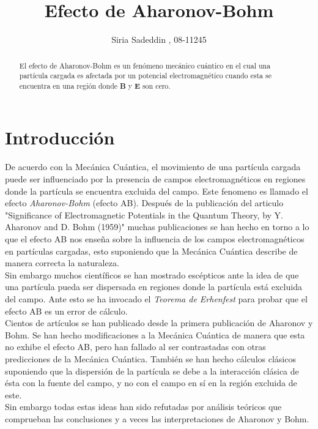 \documentclass[12pt]{article}
\title{Efecto de Aharonov-Bohm}
\author{Siria Sadeddin , 08-11245}
\begin{document}
\maketitle

\begin{abstract}
El efecto de Aharonov-Bohm es un fenómeno mecánico cuántico en el cual una partícula  cargada es afectada por un potencial electromagnético cuando esta se encuentra en una región donde \textbf{B} y \textbf{E} son cero. 
\end{abstract}
\section{Introducción}
De acuerdo con la Mecánica Cuántica, el movimiento de una partícula cargada puede ser influenciado por la presencia de campos electromagnéticos en regiones donde la partícula se encuentra excluida del campo. Este fenomeno es llamado el efecto \textit{Aharonov-Bohm} (efecto AB). Después de la publicación del articulo "Significance of Electromagnetic
Potentials in the Quantum Theory, by Y. Aharonov and D. Bohm (1959)"  muchas publicaciones se han hecho en torno a lo que el efecto AB nos enseña sobre la influencia de los campos electromagnéticos en partículas cargadas, esto suponiendo que la Mecánica Cuántica describe de manera correcta la naturaleza. \\
Sin embargo muchos científicos se han mostrado escépticos ante la idea de que una partícula pueda ser dispersada en regiones donde la partícula está excluida del campo. Ante esto se ha invocado el \textit{Teorema de Erhenfest} para probar que el efecto AB es un error de cálculo. \\
Cientos de artículos se han publicado desde la primera publicación de Aharonov y Bohm. Se han hecho modificaciones a la Mecánica Cuántica de manera que esta no exhibe el efecto AB, pero han fallado al ser contrastadas con otras predicciones de la Mecánica Cuántica. También se han hecho cálculos clásicos suponiendo que la dispersión de la partícula se debe a la interacción clásica de ésta con la fuente del campo, y no con el campo en sí en la región excluida de este.\\
Sin embargo todas estas ideas han sido refutadas por análisis teóricos que comprueban las conclusiones y a veces las interpretaciones de Aharonov y Bohm.\\
\end{document}
